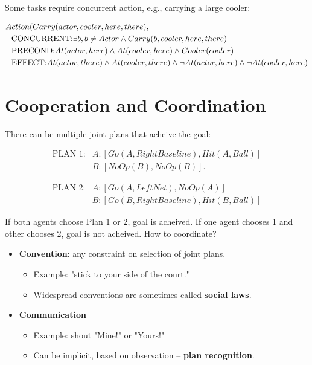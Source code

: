 \documentclass[11pt]{article}
\begin{document}
Some tasks require concurrent action, e.g., carrying a large cooler:

\vspace{-.25in}
\begin{align*}
& Action(Carry(actor, cooler, here, there),\\
& \hspace{.1in} \text{CONCURRENT:} \exists b, b \neq Actor \land Carry(b, cooler, here, there) \\
& \hspace{.1in} \text{PRECOND:} At(actor, here) \land At(cooler, here) \land Cooler(cooler) \\
& \hspace{.1in} \text{EFFECT:} At(actor, there) \land At(cooler, there) \land \neg At(actor, here) \land \neg At(cooler, here)
\end{align*}
\vspace{-.25in}
\section{Cooperation and Coordination}
\label{sec:org7567e99}

There can be multiple joint plans that acheive the goal:




\begin{align*}
\text{PLAN 1}: &A : [Go(A,RightBaseline),Hit(A,Ball)] \\
               &B : [NoOp(B),NoOp(B)].
\end{align*}




\begin{align*}
\text{PLAN 2}: &A : [Go(A,LeftNet),NoOp(A)] \\
               &B : [Go(B, RightBaseline), Hit(B, Ball)]
\end{align*}




If both agents choose Plan 1 or 2, goal is acheived.  If one agent chooses 1 and other chooses 2, goal is not acheived.  How to coordinate?

\begin{itemize}
\item \textbf{Convention}: any constraint on selection of joint plans.

\begin{itemize}
\item Example: "stick to your side of the court."
\item Widespread conventions are sometimes called \textbf{social laws}.
\end{itemize}

\item \textbf{Communication}

\begin{itemize}
\item Example: shout "Mine!" or "Yours!"
\item Can be implicit, based on observation -- \textbf{plan recognition}.
\end{itemize}
\end{itemize}
\end{document}
